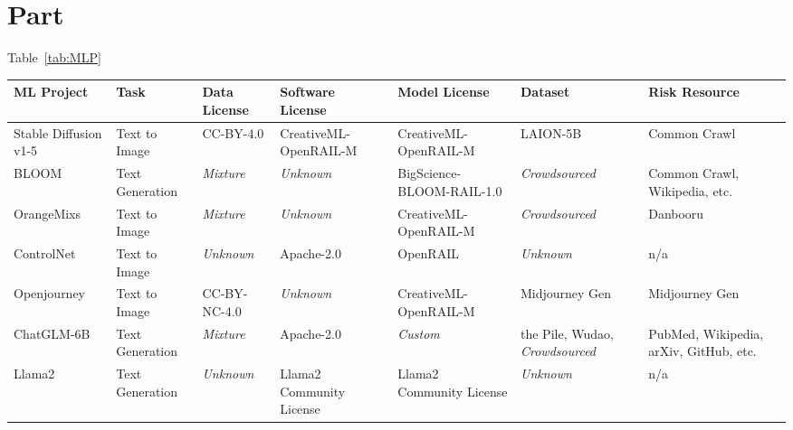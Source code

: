 \section{Part}
\label{apdx:A}

Table~\ref{tab:MLP}

\begin{table*}[t]
  \caption{Summary of licensing details for ML projects with over 1K likes on Huggingface (Accessed on October 11, 2023). }
  \footnotesize
  \label{tab:MLP}
  \begin{tabular}{|p{2.1cm}|p{1.6cm}|p{2cm}|p{2.75cm}|p{3cm}|p{1.7cm}|p{2cm}|}
      \hline
      \rowcolor[gray]{.8}
      \textbf{ML Project} & \textbf{Task} & \textbf{Data License} & \textbf{Software License} & \textbf{Model License} & \textbf{Dataset} & \textbf{Risk Resource} \\ \hline
      
      Stable Diffusion v1-5 & Text to Image & CC-BY-4.0 & CreativeML-OpenRAIL-M & CreativeML-OpenRAIL-M & LAION-5B & Common Crawl \\ \hline
      
      BLOOM & Text Generation & \textit{Mixture} & \textit{Unknown} & BigScience-BLOOM-RAIL-1.0 & \textit{Crowdsourced} & Common Crawl, \newline Wikipedia, etc. \\ \hline

      OrangeMixs & Text to Image & \textit{Mixture} & \textit{Unknown} & CreativeML-OpenRAIL-M & \textit{Crowdsourced} & Danbooru \\ \hline

      ControlNet & Text to Image &  \textit{Unknown} & Apache-2.0 & OpenRAIL & \textit{Unknown} & n/a \\ \hline

      Openjourney & Text to Image &  CC-BY-NC-4.0 & \textit{Unknown} & CreativeML-OpenRAIL-M & Midjourney Gen & Midjourney Gen \\ \hline

      ChatGLM-6B & Text Generation &  \textit{Mixture} & Apache-2.0 & \textit{Custom} & the Pile, Wudao, \newline \textit{Crowdsourced} & PubMed,  Wikipedia, \newline arXiv, GitHub, etc. \\ \hline

      Llama2 & Text Generation &  \textit{Unknown} & Llama2 Community License & Llama2 Community License & \textit{Unknown} & n/a \\ \hline


\end{tabular}
\end{table*}
